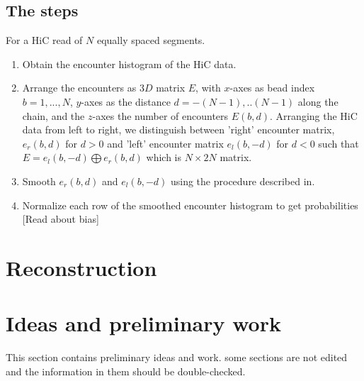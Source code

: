 \documentclass[12pt]{article}
\begin{document}
\subsection{The steps}\label{subsection_theSmoothingSteps}
For a HiC read of $N$ equally spaced segments. 
\begin{enumerate}
\item Obtain the encounter histogram of the HiC data.
\item Arrange the encounters as $3D$ matrix $E$, with $x$-axes as bead index $b=1,...,N$, $y$-axes as the distance $d=-(N-1),..(N-1)$ along the chain, and the $z$-axes the number of encounters $E(b,d)$. Arranging the HiC data from left to right, we distinguish between 'right' encounter matrix, $e_r(b,d)$ for $d>0$ and 'left' encounter matrix $e_l(b,-d)$ for $d<0$ such that $E=e_l(b,-d)\bigoplus e_r(b,d)$ which is  $N\times 2N$ matrix. 
\item Smooth $e_r(b,d)$ and $e_l(b,-d)$ using the procedure described in.
\item Normalize each row of the smoothed encounter histogram to get probabilities [Read about bias]
\end{enumerate}

\section{Reconstruction}


\section{Ideas and preliminary work}\label{section_ideasAndPreliminaryWork}
This section contains preliminary ideas and work. some sections are not edited and the information in them should be double-checked. 
\end{document}
